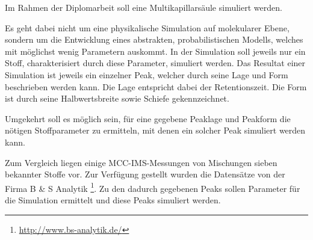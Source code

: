 \documentclass[a4paper,10pt]{article}
\begin{document}
Im Rahmen der Diplomarbeit soll eine Multikapillarsäule simuliert werden. 

Es geht dabei nicht um eine physikalische Simulation auf molekularer Ebene, sondern um die Entwicklung eines abstrakten, probabilistischen Modells, welches mit möglichst wenig Parametern auskommt. %
In der Simulation soll jeweils nur ein Stoff, charakterisiert durch diese Parameter, simuliert werden. Das Resultat einer Simulation ist jeweils ein einzelner Peak, welcher durch seine Lage und Form beschrieben werden kann. Die Lage entspricht dabei der Retentionszeit. Die Form ist durch seine Halbwertsbreite sowie Schiefe gekennzeichnet.

Umgekehrt soll es möglich sein, für eine gegebene Peaklage und Peakform die nötigen Stoffparameter zu ermitteln, mit denen ein solcher Peak simuliert werden kann.

Zum Vergleich liegen %
einige MCC-IMS-Messungen von Mischungen sieben bekannter Stoffe vor. Zur Verfügung gestellt wurden die Datensätze von der Firma B \& S Analytik \footnote{\url{http://www.bs-analytik.de/}}.  
Zu den dadurch gegebenen Peaks sollen Parameter für die Simulation ermittelt und diese Peaks simuliert werden.
\end{document}
